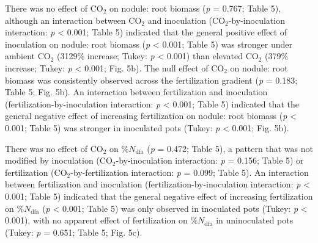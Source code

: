 There was no effect of CO$_2$ on nodule: root biomass (\textit{p} = 0.767; Table 5), although an interaction between CO$_2$ and inoculation (CO$_2$-by-inoculation interaction: \textit{p} < 0.001; Table 5) indicated that the general positive effect of inoculation on nodule: root biomass (\textit{p} < 0.001; Table 5) was stronger under ambient CO$_2$ (3129\% increase; Tukey: \textit{p} < 0.001) than elevated CO$_2$ (379\% increase; Tukey: \textit{p} < 0.001; Fig. 5b). The null effect of CO$_2$ on nodule: root biomass was consistently observed across the fertilization gradient (\textit{p} = 0.183; Table 5; Fig. 5b). An interaction between fertilization and inoculation (fertilization-by-inoculation interaction: \textit{p} < 0.001; Table 5) indicated that the general negative effect of increasing fertilization on nodule: root biomass (\textit{p} < 0.001; Table 5) was stronger in inoculated pots (Tukey: \textit{p} < 0.001; Fig. 5b). 

There was no effect of CO$_2$ on \%$N_\mathrm{dfa}$ (\textit{p} = 0.472; Table 5), a pattern that was not modified by inoculation (CO$_2$-by-inoculation interaction: \textit{p} = 0.156; Table 5) or fertilization (CO$_2$-by-fertilization interaction: \textit{p} = 0.099; Table 5). An interaction between fertilization and inoculation (fertilization-by-inoculation interaction: \textit{p} < 0.001; Table 5) indicated that the general negative effect of increasing fertilization on \%$N_\mathrm{dfa}$ (\textit{p} < 0.001; Table 5) was only observed in inoculated pots (Tukey: \textit{p} < 0.001), with no apparent effect of fertilization on \%$N_\mathrm{dfa}$ in uninoculated pots (Tukey: \textit{p} = 0.651; Table 5; Fig. 5c).


